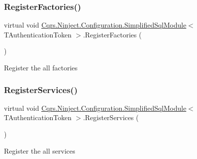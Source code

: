 \subsubsection{\texorpdfstring{Register\+Factories()}{RegisterFactories()}}
{\footnotesize\ttfamily virtual void \hyperlink{classCqrs_1_1Ninject_1_1Configuration_1_1SimplifiedSqlModule}{Cqrs.\+Ninject.\+Configuration.\+Simplified\+Sql\+Module}$<$ T\+Authentication\+Token $>$.Register\+Factories (\begin{DoxyParamCaption}{ }\end{DoxyParamCaption})\hspace{0.3cm}{\ttfamily [virtual]}}



Register the all factories 

\mbox{\label{classCqrs_1_1Ninject_1_1Configuration_1_1SimplifiedSqlModule_a61e712bdaa49aef7fc229e009d65d1fb}} 
\subsubsection{\texorpdfstring{Register\+Services()}{RegisterServices()}}
{\footnotesize\ttfamily virtual void \hyperlink{classCqrs_1_1Ninject_1_1Configuration_1_1SimplifiedSqlModule}{Cqrs.\+Ninject.\+Configuration.\+Simplified\+Sql\+Module}$<$ T\+Authentication\+Token $>$.Register\+Services (\begin{DoxyParamCaption}{ }\end{DoxyParamCaption})\hspace{0.3cm}{\ttfamily [virtual]}}



Register the all services 

